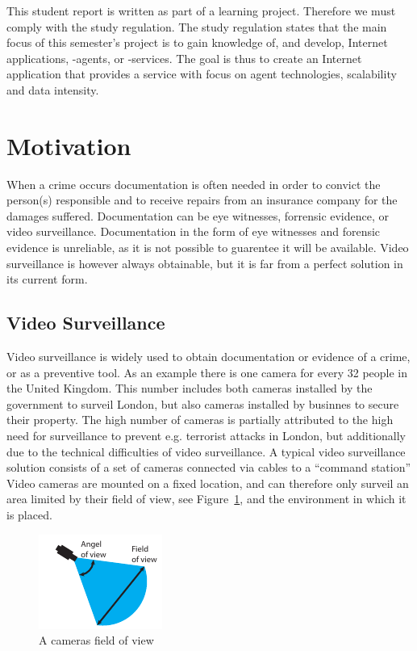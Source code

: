 This student report is written as part of a learning project. Therefore we must comply with the study regulation.
The study regulation states that the main focus of this semester's project is to gain knowledge of, and develop, Internet applications, -agents, or -services.
The goal is thus to create an Internet application that provides a service with focus on agent technologies, scalability and data intensity.

\section{Motivation}
When a crime occurs documentation is often needed in order to convict the person(s) responsible and to receive repairs from an insurance company for the damages suffered.
Documentation can be eye witnesses, forrensic evidence, or video surveillance.
Documentation in the form of eye witnesses and forensic evidence is unreliable, as it is not possible to guarentee it will be available.
Video surveillance is however always obtainable, but it is far from a perfect solution in its current form.

\subsection{Video Surveillance}
Video surveillance is widely used to obtain documentation or evidence of a crime, or as a preventive tool.
As an example there is one camera for every 32 people in the United Kingdom\citep{london_camera_surveillance}.
This number includes both cameras installed by the government to surveil London, but also cameras installed by businnes to secure their property.
The high number of cameras is partially attributed to the high need for surveillance to prevent e.g. terrorist attacks in London, but additionally due to the technical difficulties of video surveillance.
A typical video surveillance solution consists of a set of cameras connected via cables to a ``command station''
Video cameras are mounted on a fixed location, and can therefore only surveil an area limited by their field of view, see Figure~\ref{fig:camera_properties}, and the environment in which it is placed.

\begin{figure}[htb]
    \centering
    \includegraphics[scale=1.8]{gfx/camera_properties.pdf}
    \caption{A cameras field of view}
    \label{fig:camera_properties}
\end{figure}


